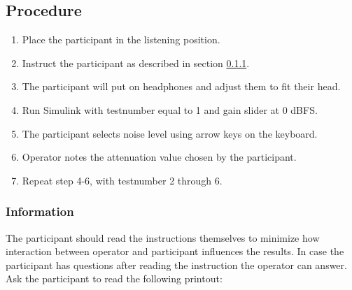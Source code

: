 \subsection{Procedure}
\begin{enumerate}
	\item Place the participant in the listening position.
	\item Instruct the participant as described in section \ref{subsubsec:attenuationInformation}.
	\item The participant will put on headphones and adjust them to fit their head.
	\item Run Simulink  with testnumber equal to 1 and gain slider at 0 dBFS.
	\item The participant selects noise level using arrow keys on the keyboard.
	\item Operator notes the attenuation value chosen by the participant.
	\item Repeat step 4-6, with testnumber 2 through 6.
\end{enumerate}

\subsubsection{Information}\label{subsubsec:attenuationInformation}
The participant should read the instructions themselves to minimize how interaction between operator and participant influences the results. In case the participant has questions after reading the instruction the operator can answer.   
Ask the participant to read the following printout:

